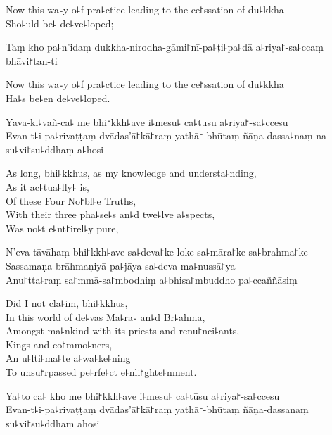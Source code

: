 \begin{english}
  Now this wa꜕y o꜕f pra꜕ctice leading to the ce꜓ssation of du꜕kkha\\
  Sho꜕uld be꜕ de꜕ve꜕loped;
\end{english}

Taṃ kho pa꜕n'idaṃ dukkha-nirodha-gāmi꜓nī-pa꜕ṭi꜕pa꜕dā a꜕riya꜓-sa꜕ccaṃ bhāvi꜓tan-ti

\begin{english}
  Now this wa꜕y o꜕f pra꜕ctice leading to the ce꜓ssation of du꜕kkha\\
  Ha꜕s be꜕en de꜕ve꜕loped.
\end{english}

Yāva-kī꜕vañ-ca꜕ me bhi꜓kkh꜕ave i꜕mesu꜕ ca꜕tūsu a꜕riya꜓-sa꜕ccesu\\
Evan-t꜕i-pa꜕rivaṭṭaṃ dvādas'ā꜓kā꜓raṃ yathā꜓-bhūtaṃ ñāṇa-dassa꜕naṃ na su꜕vi꜓su꜕ddhaṃ a꜕hosi

\begin{english}
  As long, bhi꜕kkhus, as my knowledge and understa꜕nding,\\
  As it ac꜕tua꜕lly꜕ is,\\
  Of these Four No꜓bl꜕e Truths,\\
  With their three pha꜕se꜕s an꜕d twe꜕lve a꜕spects,\\
  Was no꜕t e꜕nt꜓irel꜕y pure,
\end{english}

N'eva tāvāhaṃ bhi꜓kkh꜕ave sa꜕deva꜓ke loke sa꜕māra꜓ke sa꜕brahma꜓ke\\
Sassamaṇa-brāhmaṇiyā pa꜕jāya sa꜕deva-ma꜕nussā꜓ya\\
Anu꜓tta꜕raṃ sa꜓mmā-sa꜓mbodhiṃ a꜕bhisa꜓mbuddho pa꜕ccaññāsiṃ

\enlargethispage{\baselineskip}

\begin{english}
  Did I not cla꜕im, bhi꜕kkhus,\\
  In this world of de꜕vas Mā꜕ra꜕ an꜕d Br꜕ahmā,\\
  Amongst ma꜕nkind with its priests and renu꜓nci꜕ants,\\
  Kings and co꜓mmo꜕ners,\\
  An u꜕lti꜕ma꜕te a꜕wa꜕ke꜕ning\\
  To unsu꜓rpassed pe꜕rfe꜕ct e꜕nli꜓ghte꜕nment.
\end{english}

Ya꜕to ca꜕ kho me bhi꜓kkh꜕ave i꜕mesu꜕ ca꜕tūsu a꜕riya꜓-sa꜕ccesu\\
Evan-t꜕i-pa꜕rivaṭṭaṃ dvādas'ā꜓kā꜓raṃ yathā꜓-bhūtaṃ ñāṇa-dassanaṃ su꜕vi꜓su꜕ddhaṃ ahosi

